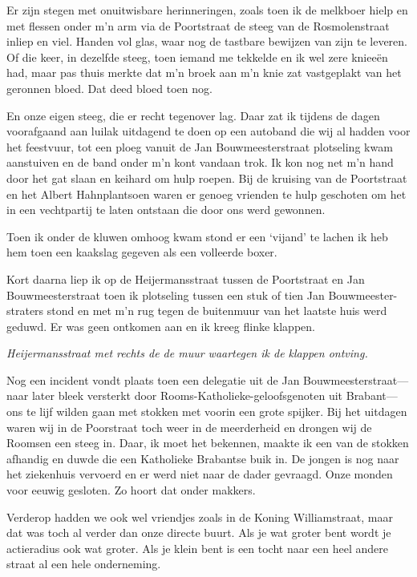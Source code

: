 \documentclass[10pt,twoside,openright]{memoir}
\begin{document}
Er zijn stegen met onuitwisbare herinneringen, zoals toen ik de melkboer hielp en met flessen onder m’n arm via de Poortstraat de steeg van de Rosmolenstraat inliep en viel. Handen vol glas, waar nog de tastbare bewijzen van zijn te leveren. Of die keer, in dezelfde steeg, toen iemand me tekkelde en ik wel zere knieeën had, maar pas thuis merkte dat m’n broek aan m’n knie zat vastgeplakt van het geronnen bloed. Dat deed bloed toen nog.

En onze eigen steeg, die er recht tegenover lag. Daar zat ik tijdens de dagen voorafgaand aan luilak uitdagend te doen op een autoband die wij al hadden voor het feestvuur, tot een ploeg vanuit de Jan Bouwmeesterstraat plotseling kwam aanstuiven en de band onder m’n kont vandaan trok. Ik kon nog net m’n hand door het gat slaan en keihard om hulp roepen. Bij de kruising van de Poortstraat en het Albert Hahnplantsoen waren er genoeg vrienden te hulp geschoten om het in een vechtpartij te laten ontstaan die door ons werd gewonnen. 

Toen ik onder de kluwen omhoog kwam stond er een ‘vijand’ te lachen ik heb hem toen een kaakslag gegeven als een volleerde boxer.

Kort daarna liep ik op de Heijermansstraat tussen de Poortstraat en Jan Bouwmeesterstraat toen ik plotseling tussen een stuk of tien Jan Bouwmeester-straters stond en met m’n rug tegen de buitenmuur van het laatste huis werd geduwd. Er was geen ontkomen aan en ik kreeg flinke klappen. 

\emph{Heijermansstraat met rechts de de muur waartegen ik de klappen ontving.}

Nog een incident vondt plaats toen een delegatie uit de Jan Bouwmeesterstraat--- naar later bleek versterkt door Rooms-Katholieke-geloofsgenoten uit Brabant---ons te lijf wilden gaan met stokken met voorin een grote spijker. Bij het uitdagen waren wij in de Poorstraat toch weer in de meerderheid en drongen wij de Roomsen een steeg in. Daar, ik moet het bekennen, maakte ik een van de stokken afhandig en duwde die een Katholieke Brabantse buik in. De jongen is nog naar het ziekenhuis vervoerd en er werd niet naar de dader gevraagd. Onze monden voor eeuwig gesloten. Zo hoort dat onder makkers.

Verderop hadden we ook wel vriendjes zoals in de Koning Williamstraat, maar dat was toch al verder dan onze directe buurt. Als je wat groter bent wordt je actieradius ook wat groter. Als je klein bent is een tocht naar een heel andere straat al een hele onderneming.
\end{document}
